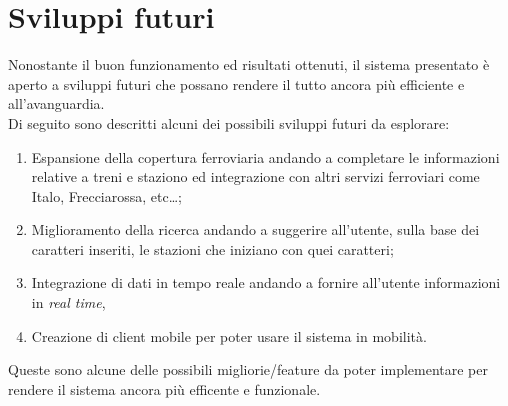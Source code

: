 \documentclass[italian,12pt,a4paper]{article}
\begin{document}
	
	\section{Sviluppi futuri}
	Nonostante il buon funzionamento ed risultati ottenuti, il sistema presentato è aperto a sviluppi futuri che possano rendere il tutto ancora più efficiente e all'avanguardia. \\
	\linebreak
	Di seguito sono descritti alcuni dei possibili sviluppi futuri da esplorare:
	
	\begin{enumerate}
		\item Espansione della copertura ferroviaria andando a completare le informazioni relative a treni e staziono ed integrazione con altri servizi ferroviari come Italo, Frecciarossa, etc\dots;
		\item Miglioramento della ricerca andando a suggerire all'utente, sulla base dei caratteri inseriti, le stazioni che iniziano con quei caratteri;
		\item Integrazione di dati in tempo reale andando a fornire all'utente informazioni in \textit{real time},
		\item Creazione di client mobile per poter usare il sistema in mobilità.
	\end{enumerate}
	Queste sono alcune delle possibili migliorie/feature da poter implementare per rendere il sistema ancora più efficente e funzionale.
	\printbibliography
	
\end{document}
